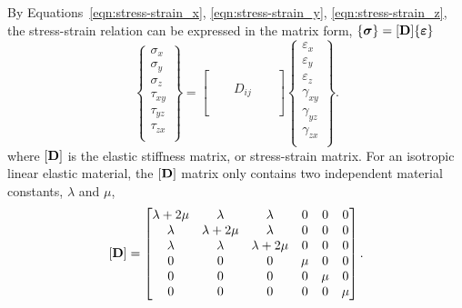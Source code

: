 \documentclass[12pt, a4paper]{article}
\numberwithin{equation}{section}
\begin{document}
By Equations~\ref{eqn:stress-strain_x}, \ref{eqn:stress-strain_y}, \ref{eqn:stress-strain_z}, the stress-strain relation can be expressed in the matrix form, $\{\boldsymbol{\sigma}\}= [\mathbf{D}] \{\boldsymbol{\varepsilon}\}$
\begin{equation}
    \begin{Bmatrix}
        \sigma_{x} \\
        \sigma_{y} \\
        \sigma_{z} \\
        \tau_{xy} \\
        \tau_{yz} \\
        \tau_{zx} \\
    \end{Bmatrix}
    = 
    \begin{bmatrix}
        & & & & \\
        & & & & \\
        & & D_{ij} & & \\
        & & & & \\
        & & & & \\
    \end{bmatrix}
    \begin{Bmatrix}
        \varepsilon_{x} \\
        \varepsilon_{y} \\
        \varepsilon_{z} \\
        \gamma_{xy} \\
        \gamma_{yz} \\
        \gamma_{zx} \\
    \end{Bmatrix}.
\end{equation}
where $[\mathbf{D}]$ is the elastic stiffness matrix, or stress-strain matrix. For an isotropic linear elastic material, the $[\mathbf{D}]$ matrix only contains two independent material constants, $\lambda$ and $\mu$,
\begin{equation}
    [\mathbf{D}] =
    \begin{bmatrix}
        \lambda + 2\mu & \lambda & \lambda & 0 & 0 & 0 \\
        \lambda & \lambda + 2\mu & \lambda & 0 & 0 & 0 \\
        \lambda & \lambda & \lambda + 2\mu & 0 & 0 & 0 \\
        0 & 0 & 0 & \mu & 0 & 0 \\
        0 & 0 & 0 & 0 & \mu & 0 \\
        0 & 0 & 0 & 0 & 0 & \mu
    \end{bmatrix}.
\end{equation}
\newpage
\end{document}
